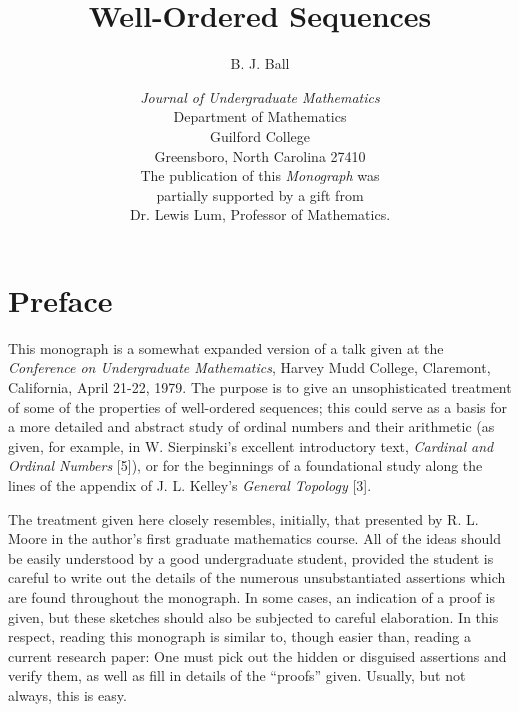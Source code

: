\documentclass{article}
\let\titlepageAuthor\author
\renewcommand{\author}[1]{\newcommand{\headerAuthor}{#1}\titlepageAuthor{#1}}
\let\titlepageTitle\title
\renewcommand{\title}[1]{\newcommand{\headerTitle}{#1}\titlepageTitle{#1}}
\begin{document}
\title{Well-Ordered Sequences}
\author{B. J. Ball}
\date{\vspace{3cm}
\emph{Journal of Undergraduate Mathematics}
  \\ Department of Mathematics
  \\ Guilford College
  \\ Greensboro, North Carolina 27410 
  \vspace{3cm}
  \\ The publication of this \emph{Monograph} was 
  \\ partially supported by a gift from 
  \\ Dr. Lewis Lum, Professor of Mathematics.
  }
\maketitle
\thispagestyle{empty}



\newpage

\setcounter{tocdepth}{3} 
\tableofcontents
\thispagestyle{empty}


\newpage

\section*{Preface}


This monograph is a somewhat expanded version of a talk given at the \emph{Conference on Undergraduate Mathematics}, Harvey Mudd College, Claremont, California, April 21-22, 1979. The purpose is to give an unsophisticated treatment of some of the properties of well-ordered sequences; this could serve as a basis for a more detailed and abstract study of ordinal numbers and their arithmetic (as given, for example, in W. Sierpinski's excellent introductory text, \emph{Cardinal and Ordinal Numbers} [5]), or for the beginnings of a foundational study along the lines of the appendix of J. L. Kelley's \emph{General Topology} [3].

The treatment given here closely resembles, initially, that presented by R. L. Moore in the author's first graduate mathematics course. All of the ideas should be easily understood by a good undergraduate student, provided the student is careful to write out the details of the numerous unsubstantiated assertions which are found throughout the monograph. In some cases, an indication of a proof is given, but these sketches should also be subjected to careful elaboration. In this respect, reading this monograph is similar to, though easier than, reading a current research paper: One must pick out the hidden or disguised assertions and verify them, as well as fill in details of the ``proofs'' given. Usually, but not always, this is easy.
\end{document}
